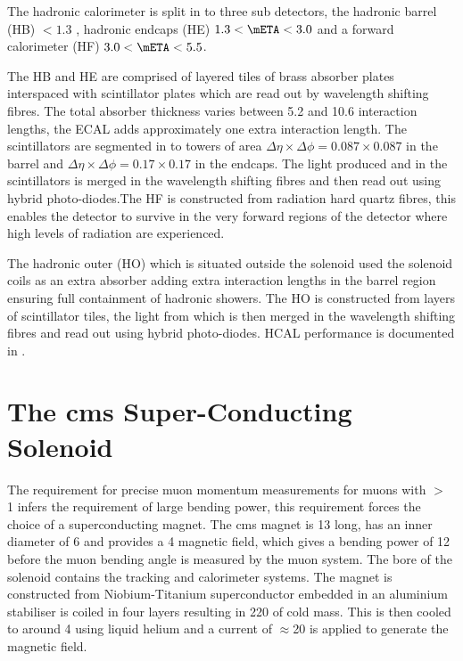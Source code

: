 The hadronic calorimeter is split in to three sub detectors, the hadronic 
barrel (HB) \mETA $< 1.3$ , hadronic endcaps (HE) $1.3 < \mETA < 3.0$ and a 
forward calorimeter (HF) $3.0 < \mETA < 5.5$.

The HB and HE are comprised of layered tiles of brass absorber plates 
interspaced with scintillator plates which are read out by wavelength shifting 
fibres. The total absorber thickness varies between 5.2 and 10.6 interaction 
lengths, the ECAL adds approximately one extra interaction length. The 
scintillators are segmented in to towers of area $\Delta\eta\times\Delta\phi = 
0.087\times0.087$ in the barrel and $\Delta\eta\times\Delta\phi = 
0.17\times0.17$ in the endcaps. The light produced and in the scintillators is 
merged in the wavelength shifting fibres and then read out using hybrid 
photo-diodes.The HF is constructed from radiation hard quartz fibres, this 
enables the detector to survive in the very forward regions of the detector 
where high levels of radiation are experienced.

The hadronic outer (HO) which is situated outside the solenoid used the 
solenoid coils as an extra absorber adding extra interaction lengths in the 
barrel region ensuring full containment of hadronic showers. The HO is 
constructed from layers of scintillator tiles, the light from which is then merged in the wavelength shifting fibres and read out using hybrid photo-diodes.
HCAL performance is documented in \cite{CMS-DP-2012-025}.


\section{The \ac{cms} Super-Conducting Solenoid} %
\label{sec:the_cms_super_conducting_solenoid}
The requirement for precise muon momentum measurements for muons with \PT $>$ 
\unit{1}{\TeV} infers the requirement of large bending power, this requirement 
forces the choice of a superconducting magnet. The \ac{cms} magnet is 
\unit{13}{\meter} long, has an inner diameter of \unit{6}{\meter} and provides 
a \unit{4}{\tesla} magnetic field, which gives a bending power of 
\unit{12}{\tesla\meter} before the muon bending angle is measured by the muon 
system. The bore of the solenoid contains the tracking and calorimeter systems.
The magnet is constructed from Niobium-Titanium superconductor embedded in an 
aluminium stabiliser is coiled in four layers resulting in \unit{220}{\ton} of 
cold mass. This is then cooled to around \unit{4}{\kelvin} using liquid helium 
and a current of $\approx$\unit{20}{\kilo\ampere} is applied to generate the 
magnetic field.


